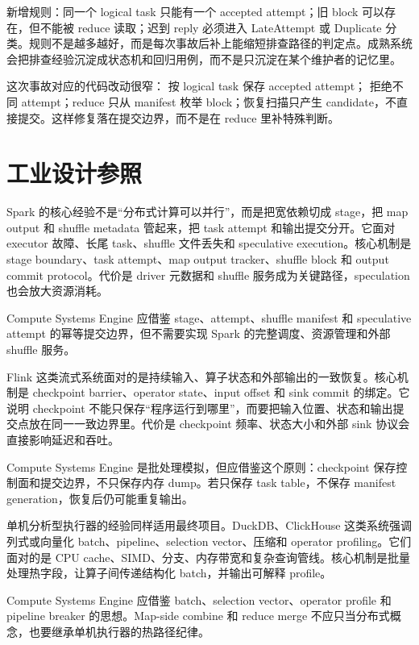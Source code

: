 新增规则：同一个 logical task 只能有一个 accepted attempt；旧 block 可以存在，但不能被 reduce 读取；迟到 reply 必须进入 LateAttempt 或 Duplicate 分类。规则不是越多越好，而是每次事故后补上能缩短排查路径的判定点。成熟系统会把排查经验沉淀成状态机和回归用例，而不是只沉淀在某个维护者的记忆里。

这次事故对应的代码改动很窄： 按 logical task 保存 accepted attempt； 拒绝不同 attempt；reduce 只从 manifest 枚举 block；恢复扫描只产生 candidate，不直接提交。这样修复落在提交边界，而不是在 reduce 里补特殊判断。

\section{工业设计参照}

\begin{casebox}
Spark 的核心经验不是“分布式计算可以并行”，而是把宽依赖切成 stage，把 map output 和 shuffle metadata 管起来，把 task attempt 和输出提交分开。它面对 executor 故障、长尾 task、shuffle 文件丢失和 speculative execution。核心机制是 stage boundary、task attempt、map output tracker、shuffle block 和 output commit protocol。代价是 driver 元数据和 shuffle 服务成为关键路径，speculation 也会放大资源消耗。

Compute Systems Engine 应借鉴 stage、attempt、shuffle manifest 和 speculative attempt 的幂等提交边界，但不需要实现 Spark 的完整调度、资源管理和外部 shuffle 服务。
\end{casebox}

\begin{casebox}
Flink 这类流式系统面对的是持续输入、算子状态和外部输出的一致恢复。核心机制是 checkpoint barrier、operator state、input offset 和 sink commit 的绑定。它说明 checkpoint 不能只保存“程序运行到哪里”，而要把输入位置、状态和输出提交点放在同一一致边界里。代价是 checkpoint 频率、状态大小和外部 sink 协议会直接影响延迟和吞吐。

Compute Systems Engine 是批处理模拟，但应借鉴这个原则：checkpoint 保存控制面和提交边界，不只保存内存 dump。若只保存 task table，不保存 manifest generation，恢复后仍可能重复输出。
\end{casebox}

\begin{casebox}
单机分析型执行器的经验同样适用最终项目。DuckDB、ClickHouse 这类系统强调列式或向量化 batch、pipeline、selection vector、压缩和 operator profiling。它们面对的是 CPU cache、SIMD、分支、内存带宽和复杂查询管线。核心机制是批量处理热字段，让算子间传递结构化 batch，并输出可解释 profile。

Compute Systems Engine 应借鉴 batch、selection vector、operator profile 和 pipeline breaker 的思想。Map-side combine 和 reduce merge 不应只当分布式概念，也要继承单机执行器的热路径纪律。
\end{casebox}

